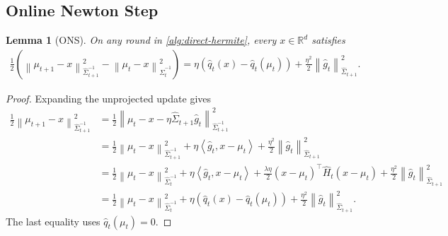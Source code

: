 \documentclass[11pt]{article}
\newtheorem{lemma}[lemma]{Lemma}
\newcommand{\R}{\mathbb R}
\newcommand{\1}{\mathbf 1}
\newcommand{\ip}[2]{\left\langle #1,#2\right\rangle}
\newcommand{\normm}[2]{\left\lVert #1\right\rVert_{#2}}
\begin{document}
\subsection{Online Newton Step}
\begin{lemma}[ONS]
    \label{lem:ons-step}
    On any round in \cref{alg:direct-hermite}, every $x\in\R^d$ satisfies
    \begin{align}
        \frac12
        \left(\normm{\mu_{t+1}-x}{\widehat\Sigma_{t+1}^{-1}}^2
        -\normm{\mu_t-x}{\widehat\Sigma_t^{-1}}^2\right)
        =
        \eta\left(
        \widehat q_t(x)-\widehat q_t(\mu_t)
        \right)
        +\frac{\eta^2}{2}\normm{\widehat g_t}{\widehat\Sigma_{t+1}}^2.
        \label{eq:ons-step}
    \end{align}
\end{lemma}
\begin{proof}
    Expanding the unprojected update gives
    \begin{align}
        \frac12\normm{\mu_{t+1}-x}{\widehat\Sigma_{t+1}^{-1}}^2
         & =
        \frac12\normm{\mu_t-x-\eta\widehat\Sigma_{t+1}\widehat g_t}
        {\widehat\Sigma_{t+1}^{-1}}^2
        \\
         & =
        \frac12\normm{\mu_t-x}{\widehat\Sigma_{t+1}^{-1}}^2
        +\eta\ip{\widehat g_t}{x-\mu_t}
        +\frac{\eta^2}{2}\normm{\widehat g_t}{\widehat\Sigma_{t+1}}^2
        \\
         & =
        \frac12\normm{\mu_t-x}{\widehat\Sigma_t^{-1}}^2
        +\eta\ip{\widehat g_t}{x-\mu_t}
        +\frac{\lambda\eta}{2}(x-\mu_t)^\top\widehat H_t(x-\mu_t)
        +\frac{\eta^2}{2}\normm{\widehat g_t}{\widehat\Sigma_{t+1}}^2
        \\
         & =
        \frac12\normm{\mu_t-x}{\widehat\Sigma_t^{-1}}^2
        +\eta\left(\widehat q_t(x)-\widehat q_t(\mu_t)\right)
        +\frac{\eta^2}{2}\normm{\widehat g_t}{\widehat\Sigma_{t+1}}^2.
    \end{align}
    The last equality uses $\widehat q_t(\mu_t)=0$.
\end{proof}
\end{document}
